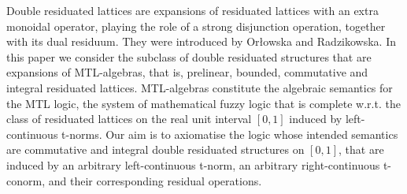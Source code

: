 
Double residuated lattices are expansions of residuated lattices with an extra monoidal operator, playing the role of a strong disjunction operation, together with its dual residuum. They were introduced by Or{\l}owska and Radzikowska. In this paper we consider the subclass of double residuated structures that are expansions  of MTL-algebras, that is, prelinear, bounded, commutative and integral residuated lattices. MTL-algebras constitute the algebraic semantics for the MTL logic, the system of mathematical fuzzy logic that is complete w.r.t. the class of residuated lattices on the real unit interval $[0,1]$ induced by left-continuous t-norms. Our aim is to axiomatise the logic whose intended semantics are commutative and integral double residuated structures on $[0, 1]$, that are induced by an arbitrary left-continuous t-norm, an arbitrary right-continuous t-conorm, and their corresponding residual operations.

